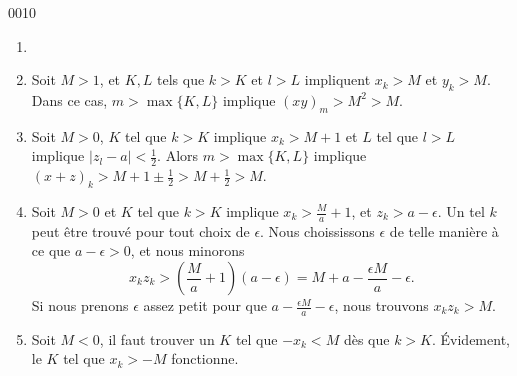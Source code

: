 
\begin{corrige}{0010}

\begin{enumerate}
\item 
\item Soit $M>1$, et $K,L$ tels que $k>K$ et $l>L$ impliquent $x_k>M$ et $y_k>M$. Dans ce cas, $m>\max\{K,L\}$ implique $(xy)_m>M^2>M$.
\item Soit $M>0$, $K$ tel que $k>K$ implique $x_k>M+1$ et $L$ tel que $l>L$ implique $| z_l-a |<\frac{ 1 }{2}$. Alors $m>\max\{ K,L \}$ implique $(x+z)_k>M+1\pm\frac{ 1 }{2}>M+\frac{ 1 }{2}>M$.
\item Soit $M>0$ et $K$ tel que $k>K$ implique $x_k>\frac{ M }{ a }+1$, et $z_k>a-\epsilon$. Un tel $k$ peut être trouvé pour tout choix de $\epsilon$. Nous choississons $\epsilon$ de telle manière à ce que $a-\epsilon>0$, et nous minorons
\begin{equation}
	x_kz_k>\left( \frac{ M }{ a }+1 \right)(a-\epsilon)=M+a-\frac{ \epsilon M }{ a }-\epsilon.
\end{equation}
Si nous prenons $\epsilon$ assez petit pour que $a-\frac{ \epsilon M }{ a }-\epsilon$, nous trouvons $x_kz_k>M$.

\item Soit $M<0$, il faut trouver un $K$ tel que $-x_k<M$ dès que $k>K$. Évidement, le $K$ tel que $x_k>-M$ fonctionne.

\end{enumerate}

\end{corrige}
